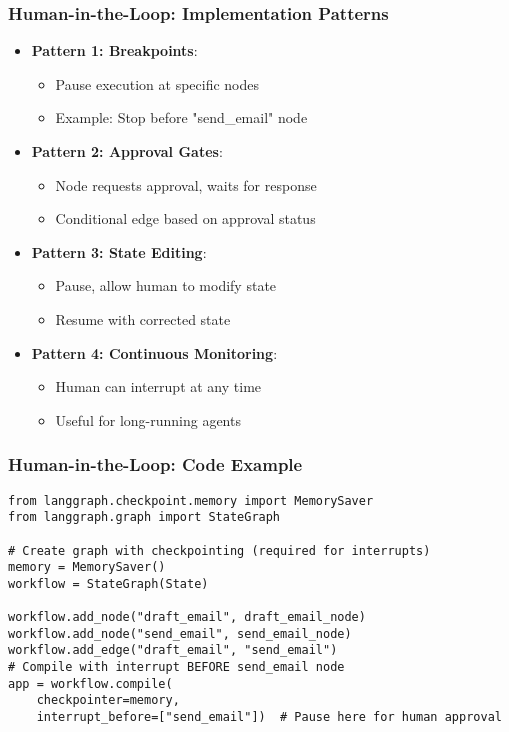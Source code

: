 \begin{frame}[fragile]\frametitle{Human-in-the-Loop: Implementation Patterns}
      \begin{itemize}
        \item \textbf{Pattern 1: Breakpoints}:
        \begin{itemize}
            \item Pause execution at specific nodes
            \item Example: Stop before "send\_email" node
        \end{itemize}
        \item \textbf{Pattern 2: Approval Gates}:
        \begin{itemize}
            \item Node requests approval, waits for response
            \item Conditional edge based on approval status
        \end{itemize}
        \item \textbf{Pattern 3: State Editing}:
        \begin{itemize}
            \item Pause, allow human to modify state
            \item Resume with corrected state
        \end{itemize}
        \item \textbf{Pattern 4: Continuous Monitoring}:
        \begin{itemize}
            \item Human can interrupt at any time
            \item Useful for long-running agents
        \end{itemize}
      \end{itemize}
\end{frame}

\begin{frame}[fragile]\frametitle{Human-in-the-Loop: Code Example}
\begin{lstlisting}from langgraph.checkpoint.memory import MemorySaver
from langgraph.graph import StateGraph

# Create graph with checkpointing (required for interrupts)
memory = MemorySaver()
workflow = StateGraph(State)

workflow.add_node("draft_email", draft_email_node)
workflow.add_node("send_email", send_email_node)
workflow.add_edge("draft_email", "send_email")
# Compile with interrupt BEFORE send_email node
app = workflow.compile(
    checkpointer=memory,
    interrupt_before=["send_email"])  # Pause here for human approval

      \end{lstlisting}
\end{frame}

